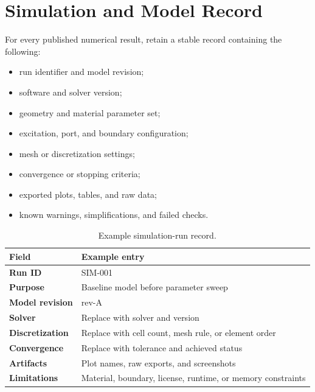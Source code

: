 \chapter{Simulation and Model Record}
\label{app:simulation-record}

For every published numerical result, retain a stable record containing the following:
\begin{itemize}[leftmargin=2em]
\item run identifier and model revision;
\item software and solver version;
\item geometry and material parameter set;
\item excitation, port, and boundary configuration;
\item mesh or discretization settings;
\item convergence or stopping criteria;
\item exported plots, tables, and raw data;
\item known warnings, simplifications, and failed checks.
\end{itemize}

\begin{table}[H]
\centering
\caption{Example simulation-run record.}
\begin{tabularx}{\textwidth}{>{\bfseries}p{}X}
\toprule
Field & Example entry \\
\midrule
Run ID & SIM-001 \\
Purpose & Baseline model before parameter sweep \\
Model revision & rev-A \\
Solver & Replace with solver and version \\
Discretization & Replace with cell count, mesh rule, or element order \\
Convergence & Replace with tolerance and achieved status \\
Artifacts & Plot names, raw exports, and screenshots \\
Limitations & Material, boundary, license, runtime, or memory constraints \\
\bottomrule
\end{tabularx}
\end{table}
